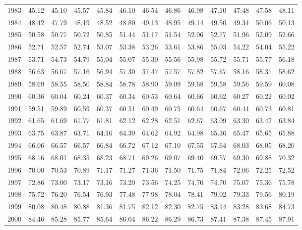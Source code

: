 \begin{longtable}{rrrrrrrrrrrrr}
  1983 & 45.12 & 45.10 & 45.57 & 45.84 & 46.10 & 46.54 & 46.86 & 46.98 & 47.10 & 47.48 & 47.58 & 48.11 \\ 
  1984 & 48.42 & 47.79 & 48.19 & 48.52 & 48.80 & 49.13 & 48.95 & 49.14 & 49.50 & 49.34 & 50.06 & 50.13 \\ 
  1985 & 50.58 & 50.77 & 50.72 & 50.85 & 51.44 & 51.17 & 51.54 & 52.06 & 52.77 & 51.96 & 52.09 & 52.66 \\ 
  1986 & 52.71 & 52.57 & 52.74 & 53.07 & 53.38 & 53.26 & 53.61 & 53.86 & 55.03 & 54.22 & 54.04 & 55.22 \\ 
  1987 & 53.71 & 54.73 & 54.79 & 55.04 & 55.07 & 55.30 & 55.56 & 55.98 & 55.72 & 55.71 & 55.77 & 56.18 \\ 
  1988 & 56.63 & 56.67 & 57.16 & 56.94 & 57.30 & 57.47 & 57.57 & 57.82 & 57.67 & 58.16 & 58.31 & 58.62 \\ 
  1989 & 58.69 & 58.55 & 58.50 & 58.84 & 58.78 & 58.90 & 59.09 & 59.68 & 59.58 & 59.56 & 59.59 & 60.08 \\ 
  1990 & 60.36 & 60.04 & 60.24 & 60.37 & 60.34 & 60.53 & 60.64 & 60.66 & 60.62 & 60.27 & 60.22 & 60.02 \\ 
  1991 & 59.51 & 59.89 & 60.59 & 60.37 & 60.51 & 60.49 & 60.75 & 60.64 & 60.67 & 60.44 & 60.73 & 60.81 \\ 
  1992 & 61.65 & 61.69 & 61.77 & 61.81 & 62.12 & 62.28 & 62.51 & 62.67 & 63.09 & 63.30 & 63.42 & 63.84 \\ 
  1993 & 63.75 & 63.87 & 63.71 & 64.16 & 64.39 & 64.62 & 64.92 & 64.98 & 65.36 & 65.47 & 65.65 & 65.88 \\ 
  1994 & 66.06 & 66.57 & 66.57 & 66.84 & 66.72 & 67.12 & 67.10 & 67.55 & 67.64 & 68.03 & 68.05 & 68.20 \\ 
  1995 & 68.16 & 68.01 & 68.35 & 68.23 & 68.71 & 69.26 & 69.07 & 69.40 & 69.57 & 69.30 & 69.88 & 70.32 \\ 
  1996 & 70.00 & 70.53 & 70.89 & 71.17 & 71.27 & 71.36 & 71.50 & 71.75 & 71.84 & 72.06 & 72.25 & 72.52 \\ 
  1997 & 72.86 & 73.00 & 73.17 & 73.16 & 73.20 & 73.56 & 74.25 & 74.70 & 74.70 & 75.07 & 75.36 & 75.78 \\ 
  1998 & 75.72 & 76.20 & 76.54 & 76.93 & 77.48 & 77.98 & 78.04 & 78.41 & 79.02 & 79.33 & 79.56 & 80.19 \\ 
  1999 & 80.08 & 80.48 & 80.88 & 81.36 & 81.75 & 82.12 & 82.30 & 82.75 & 83.14 & 83.28 & 83.68 & 84.73 \\ 
  2000 & 84.46 & 85.28 & 85.77 & 85.64 & 86.04 & 86.22 & 86.29 & 86.73 & 87.41 & 87.38 & 87.45 & 87.91 \\ 

\end{longtable}
